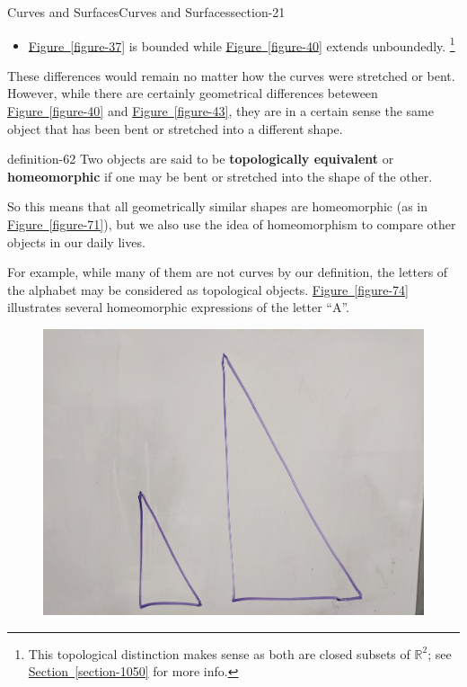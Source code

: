 \documentclass[oneside,10pt,]{article}
\newcommand{\terminology}[1]{\textbf{#1}}
\begin{document}
\begin{sectionptx}{Curves and Surfaces}{}{Curves and Surfaces}{}{}{section-21}
\begin{itemize}[label=\textbullet]
\item{}\hyperref[figure-37]{Figure~\ref{figure-37}} is bounded while \hyperref[figure-40]{Figure~\ref{figure-40}} extends unboundedly. \footnote{This topological distinction makes sense as both are closed subsets of \(\mathbb R^2\); see \hyperref[section-1050]{Section~\ref{section-1050}} for more info.\label{fn-56}}%
\end{itemize}
\hypertarget{p-59}{}%
These differences would remain no matter how the curves were stretched or bent. However, while there are certainly geometrical differences beteween \hyperref[figure-40]{Figure~\ref{figure-40}} and \hyperref[figure-43]{Figure~\ref{figure-43}}, they are in a certain sense the same object that has been bent or stretched into a different shape.%
\begin{definition}{}{definition-62}%
\hypertarget{p-63}{}%
Two objects are said to be \terminology{topologically equivalent} or \terminology{homeomorphic} if one may be bent or stretched into the shape of the other.%
\end{definition}
\hypertarget{p-66}{}%
So this means that all geometrically similar shapes are homeomorphic (as in \hyperref[figure-71]{Figure~\ref{figure-71}}), but we also use the idea of homeomorphism to compare other objects in our daily lives.%
\par
\hypertarget{p-68}{}%
For example, while many of them are not curves by our definition, the letters of the alphabet may be considered as topological objects. \hyperref[figure-74]{Figure~\ref{figure-74}} illustrates several homeomorphic expressions of the letter ``A''.%
\begin{figure}
\centering
\includegraphics[width=1\linewidth]{images/similar-triangles.jpg}

\end{figure}
\end{sectionptx}
\end{document}
